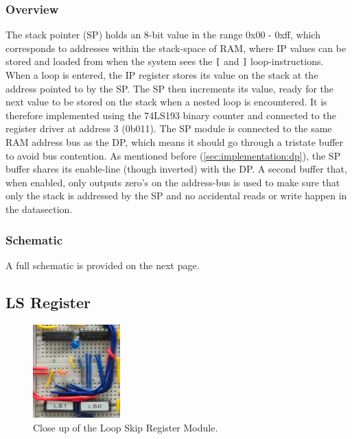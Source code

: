 \subsubsection{Overview}
The stack pointer (SP) holds an 8-bit value in the range 0x00 - 0xff, which corresponds to addresses within the stack-space of RAM, where IP values can be stored and loaded from when the system sees the \texttt{[} and \texttt{]} loop-instructions. When a loop is entered, the IP register stores its value on the stack at the address pointed to by the SP. The SP then increments its value, ready for the next value to be stored on the stack when a nested loop is encountered. It is therefore implemented using the 74LS193 binary counter and connected to the register driver at address 3 (0b011). The SP module is connected to the same RAM address bus as the DP, which means it should go through a tristate buffer to avoid bus contention. As mentioned before (\ref{sec:implementation:dp}), the SP buffer shares its enable-line (though inverted) with the DP. A second buffer that, when enabled, only outputs zero's on the address-bus is used to make sure that only the stack is addressed by the SP and no accidental reads or write happen in the datasection. 


\subsubsection{Schematic}
A full schematic is provided on the next page.




\subsection{LS Register}
\begin{figure}[H]
  \centering
  \includegraphics[width=0.3\textwidth]{img/lsregistercloseup}
  \caption{Close up of the Loop Skip Register Module.}
  \label{fig:spregcloseup}
\end{figure}

